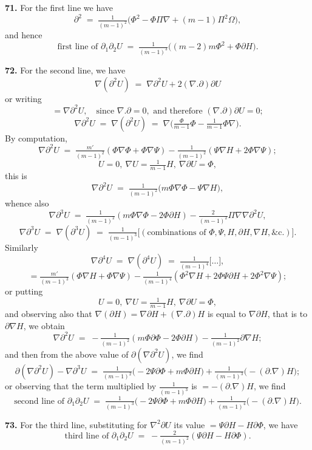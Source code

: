 \documentclass[11pt,a4paper]{article}
\begin{document}
\medskip

\textbf{71.} For the first line we have
\[
\partial^2 \;=\; \tfrac{1}{(m-1)^2}\bigl(\Phi^2 - \Phi\Pi\nabla + (m-1)\Pi^2\Omega\bigr),
\]
and hence
\[
\text{first line of } \partial_1\partial_2 U \;=\; \tfrac{1}{(m-1)^3}\bigl((m-2)m\Phi^2 + \Phi\partial H\bigr).
\]

\textbf{72.} For the second line, we have
\[
\nabla(\partial^2 U) \;=\; \nabla\partial^2 U + 2(\nabla.\partial)\partial U
\]
or writing
\[
= \nabla\partial^2 U,\quad \text{since } \nabla.\partial = 0,\text{ and therefore }(\nabla.\partial)\partial U = 0;
\]
\[
\nabla\partial^2 U \;=\; \nabla(\partial^2 U) \;=\; \nabla\bigl(\tfrac{\Phi}{m-1}\Phi - \tfrac{1}{m-1}\Phi\nabla\bigr).
\]
By computation,
\[
\nabla\partial^2 U \;=\; \tfrac{m'}{(m-1)^2}(\Phi\nabla\Phi + \Phi\nabla\Psi) - \tfrac{1}{(m-1)^2}(\Psi\nabla H + 2\Phi\nabla\Psi);
\]
\[
U = 0,\ \nabla U = \tfrac{1}{m-1}H,\ \nabla\partial U = \Phi,
\]
this is
\[
\nabla\partial^2 U \;=\; \tfrac{1}{(m-1)^2}\bigl(m\Phi\nabla\Phi - \Psi\nabla H\bigr),
\]
whence also
\[
\nabla\partial^3 U \;=\; \tfrac{1}{(m-1)^2}(m\Phi\nabla\Phi - 2\Phi\partial H) - \tfrac{2}{(m-1)^2}\Pi\nabla\nabla\partial^2 U,
\]
\[
\nabla\partial^3 U \;=\; \nabla(\partial^3 U) \;=\; \tfrac{1}{(m-1)^3}\bigl[(\text{combinations of }\Phi,\Psi,H,\partial H,\nabla H,\&\text{c.})\bigr].
\]
Similarly
\[
\nabla\partial^4 U \;=\; \nabla(\partial^4 U) \;=\; \tfrac{1}{(m-1)^4}\bigl[\ldots\bigr],
\]
\[
= \tfrac{m'}{(m-1)^3}(\Phi\nabla H + \Phi\nabla\Psi) - \tfrac{1}{(m-1)^4}(\Phi^2\nabla H + 2\Phi\Psi\partial H + 2\Phi^2\nabla\Psi);
\]
or putting
\[
U = 0,\ \nabla U = \tfrac{1}{m-1}H,\ \nabla\partial U = \Phi,
\]
and observing also that $\nabla(\partial H) = \nabla\partial H + (\nabla.\partial)H$ is equal to $\nabla\partial H$, that is to $\partial\nabla H$, we obtain
\[
\nabla\partial^2 U \;=\; -\tfrac{1}{(m-1)^2}(m\Phi\partial\Phi - 2\Phi\partial H) - \tfrac{1}{(m-1)^2}\partial\nabla H;
\]
and then from the above value of $\partial(\nabla\partial^2 U)$, we find
\[
\partial(\nabla\partial^2 U) - \nabla\partial^3 U \;=\; \tfrac{1}{(m-1)^2}\bigl(-2\Psi\partial\Phi + m\Phi\partial H\bigr) + \tfrac{1}{(m-1)^3}\bigl(-(\partial.\nabla)H\bigr);
\]
or observing that the term multiplied by $\tfrac{1}{(m-1)^3}$ is $= -(\partial.\nabla)H$, we find
\[
\text{second line of } \partial_1\partial_2 U \;=\; \tfrac{1}{(m-1)^3}\bigl(-2\Psi\partial\Phi + m\Phi\partial H\bigr) + \tfrac{1}{(m-1)^4}\bigl(-(\partial.\nabla)H\bigr).
\]

\medskip

\textbf{73.} For the third line, substituting for $\nabla^2\partial U$ its value $= \Psi\partial H - H\partial\Phi$, we have
\[
\text{third line of } \partial_1\partial_2 U \;=\; -\tfrac{2}{(m-1)^2}(\Psi\partial H - H\partial\Phi).
\]
\end{document}
